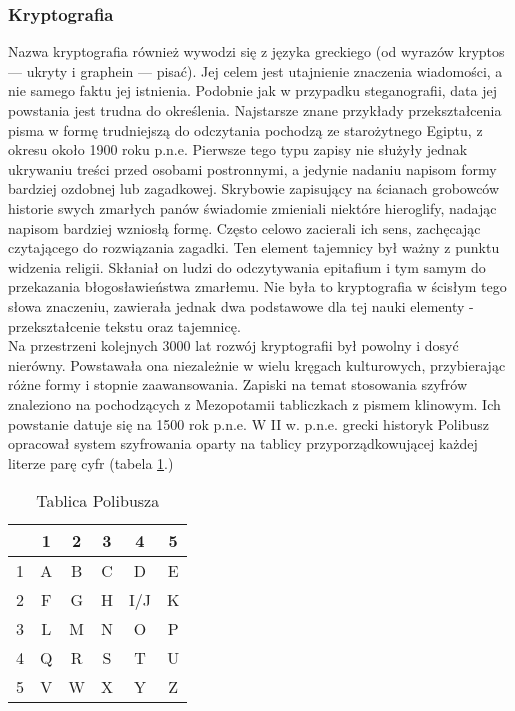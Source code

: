 \documentclass[10pt, a4paper, titlepage]{article}
\begin{document}
\subsubsection{Kryptografia}
Nazwa kryptografia również wywodzi się z języka greckiego (od wyrazów kryptos — ukryty i graphein — pisać). Jej celem jest utajnienie znaczenia wiadomości, a nie samego faktu jej istnienia. Podobnie jak w przypadku steganografii, data jej powstania jest trudna do określenia. Najstarsze znane przykłady przekształcenia pisma w formę trudniejszą do odczytania pochodzą ze starożytnego Egiptu, z okresu około 1900 roku p.n.e. Pierwsze tego typu zapisy nie służyły jednak ukrywaniu treści przed osobami postronnymi, a jedynie nadaniu napisom formy bardziej ozdobnej lub zagadkowej. Skrybowie zapisujący na ścianach grobowców historie swych zmarłych panów świadomie zmieniali niektóre hieroglify, nadając napisom bardziej wzniosłą formę. Często celowo zacierali ich sens, zachęcając czytającego do rozwiązania zagadki. Ten element tajemnicy był ważny z punktu widzenia religii. Skłaniał on ludzi do odczytywania epitafium i tym samym do przekazania błogosławieństwa zmarłemu. Nie była to kryptografia w ścisłym tego słowa znaczeniu, zawierała jednak dwa podstawowe dla tej nauki elementy - przekształcenie tekstu oraz tajemnicę.\\
Na przestrzeni kolejnych 3000 lat rozwój kryptografii był powolny i dosyć nierówny. Powstawała ona niezależnie w wielu kręgach kulturowych, przybierając różne formy i stopnie zaawansowania. Zapiski na temat stosowania szyfrów znaleziono na pochodzących z Mezopotamii tabliczkach z pismem klinowym. Ich powstanie datuje się na 1500 rok p.n.e. W II w. p.n.e. grecki historyk Polibusz opracował system szyfrowania oparty na tablicy przyporządkowującej każdej literze parę cyfr (tabela \ref{tabela 1}.)\\
\begin{table}[h]
\centering\caption{Tablica Polibusza}\label{tabela 1}
\begin{tabular}{| c | c | c | c | c | c |}
\hline
& 1 & 2 & 3 & 4 & 5 \\
\hline
1 & A & B & C & D & E \\
\hline
2 & F & G & H & I/J & K \\
\hline
3 & L & M & N & O & P \\
\hline
4 & Q & R & S & T & U \\
\hline
5 & V & W & X & Y & Z \\
\hline
\end{tabular}
\end{table}\\
\end{document}
